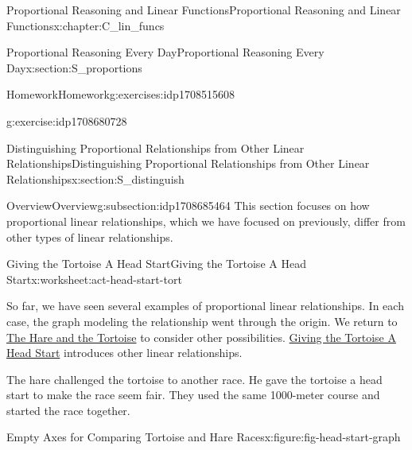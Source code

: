 \documentclass[oneside,10pt,]{book}
\numberwithin{equation}{chapter}
\begin{document}
\begin{chapterptx}{Proportional Reasoning and Linear Functions}{}{Proportional Reasoning and Linear Functions}{}{}{x:chapter:C_lin_funcs}
\begin{sectionptx}{Proportional Reasoning Every Day}{}{Proportional Reasoning Every Day}{}{}{x:section:S_proportions}
\begin{exercises-subsection}{Homework}{}{Homework}{}{}{g:exercises:idp1708515608}
\begin{divisionexercise}{10}{}{}{g:exercise:idp1708680728}
\end{divisionexercise}%
\end{exercises-subsection}
\end{sectionptx}
%
%
\typeout{************************************************}
\typeout{************************************************}
%
\begin{sectionptx}{Distinguishing Proportional Relationships from Other Linear Relationships}{}{Distinguishing Proportional Relationships from Other Linear Relationships}{}{}{x:section:S_distinguish}
%
%
\typeout{************************************************}
\typeout{************************************************}
%
\begin{subsectionptx}{Overview}{}{Overview}{}{}{g:subsection:idp1708685464}
This section focuses on how proportional linear relationships, which we have focused on previously, differ from other types of linear relationships.%
\end{subsectionptx}
%
%
\typeout{************************************************}
\typeout{************************************************}
%
\begin{worksheet-subsection}{Giving the Tortoise A Head Start}{}{Giving the Tortoise A Head Start}{}{}{x:worksheet:act-head-start-tort}
\begin{introduction}{}%
So far, we have seen several examples of proportional linear relationships. In each case, the graph modeling the relationship went through the origin. We return to \hyperref[x:worksheet:act-hare-tort]{The Hare and the Tortoise} to consider other possibilities. \hyperref[x:worksheet:act-head-start-tort]{Giving the Tortoise A Head Start} introduces other linear relationships.%
\par
The hare challenged the tortoise to another race. He gave the tortoise a head start to make the race seem fair. They used the same 1000-meter course and started the race together.%
\begin{figureptx}{Empty Axes for Comparing Tortoise and Hare Races}{x:figure:fig-head-start-graph}{}%
\begin{image}{0.1}{0.8}{0.1}%

\end{image}
\end{figureptx}
\end{introduction}
\end{worksheet-subsection}
\end{sectionptx}
\end{chapterptx}
\end{document}
